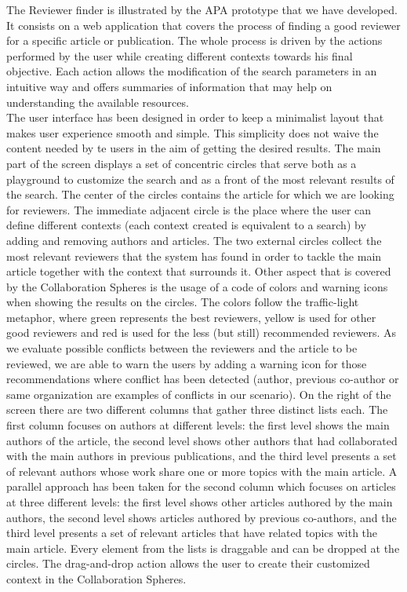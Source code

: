 The Reviewer finder is illustrated by the APA prototype that we have developed. It consists on a web application that covers the process of finding a good reviewer for a specific article or publication. The whole process is driven by the actions performed by the user while creating different contexts towards his final objective. Each action allows the modification of the search parameters in an intuitive way and offers summaries of information that may help on understanding the available resources.\\
The user interface has been designed in order to keep a minimalist layout that makes user experience smooth and simple. This simplicity does not waive the content needed by te users in the aim of getting the desired results. The main part of the screen displays a set of concentric circles that serve both as a playground to customize the search and as a front of the most relevant results of the search. 
The center of the circles contains the article for which we are looking for reviewers. The immediate adjacent circle is the place where the user can define different contexts (each context created is equivalent to a search) by adding and removing authors and articles. The two external circles collect the most relevant reviewers that the system has found in order to tackle the main article together with the context that surrounds it.
Other aspect that is covered by the Collaboration Spheres is the usage of a code of colors and warning icons when showing the results on the circles. The colors follow the traffic-light metaphor, where green represents the best reviewers, yellow is used for other good reviewers and red is used for the less (but still) recommended reviewers. As we evaluate possible conflicts between the reviewers and the article to be reviewed, we are able to warn the users by adding a warning icon for those recommendations where conflict has been detected (author, previous co-author or same organization are examples of conflicts in our scenario). 
On the right of the screen there are two different columns that gather three distinct lists each. The first column focuses on authors at different levels: the first level shows the main authors of the article, the second level shows other authors that had collaborated with the main authors in previous publications, and the third level presents a set of relevant authors whose work share one or more topics with the main article. A parallel approach has been taken for the second column which focuses on articles at three different levels: the first level shows other articles authored by the main authors,  the second level shows articles authored by previous co-authors, and the third level presents a set of relevant articles that have related topics with the main article. Every element from the lists is draggable and can be dropped at the circles. The drag-and-drop action allows the user to create their customized context in the Collaboration Spheres.
